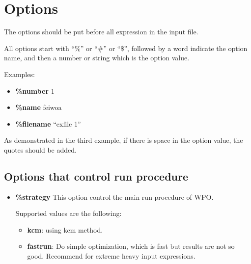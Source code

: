 \documentclass[a4paper]{article}
\begin{document}
\section{Options}
The options should be put before all expression in the input file.

All options start with ``\%'' or ``\#'' or ``\$'', followed by a word indicate the option name, and then a number or string which is the option value. 

Examples:
\begin{itemize}
\item \textbf{\%number} 1
\item \textbf{\%name} feiwoa
\item \textbf{\%filename} ``exfile 1''
\end{itemize}

As demonstrated in the third example, if there is space in the option value, the quotes should be added.

\subsection{Options that control run procedure}
\begin{itemize}
\item \textbf{\%strategy}
This option control the main run procedure of WPO.

Supported values are the following:
\begin{itemize}
  \item \textbf{kcm}: using kcm method.
\item \textbf{fastrun}: Do simple optimization, which is fast but results are not so good. Recommend for extreme heavy input expressions.
\end{itemize}

\end{itemize}
\end{document}
